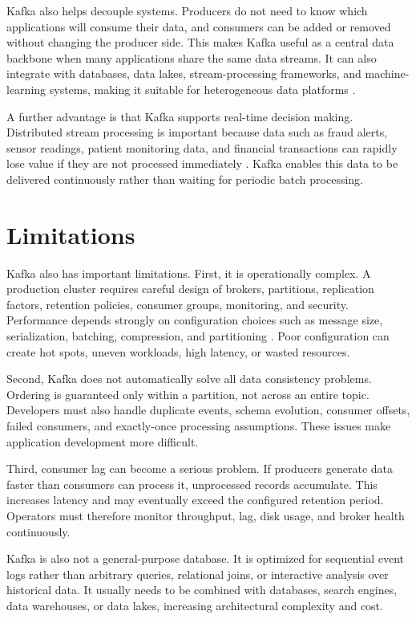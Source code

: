 \documentclass[10pt,a4paper,twocolumn]{article}
\begin{document}
Kafka also helps decouple systems. Producers do not need to know which applications will consume their data, and consumers can be added or removed without changing the producer side. This makes Kafka useful as a central data backbone when many applications share the same data streams. It can also integrate with databases, data lakes, stream-processing frameworks, and machine-learning systems, making it suitable for heterogeneous data platforms \cite{raptis2023survey}.

A further advantage is that Kafka supports real-time decision making. Distributed stream processing is important because data such as fraud alerts, sensor readings, patient monitoring data, and financial transactions can rapidly lose value if they are not processed immediately \cite{isah2019survey}. Kafka enables this data to be delivered continuously rather than waiting for periodic batch processing.

\section{Limitations}

Kafka also has important limitations. First, it is operationally complex. A production cluster requires careful design of brokers, partitions, replication factors, retention policies, consumer groups, monitoring, and security. Performance depends strongly on configuration choices such as message size, serialization, batching, compression, and partitioning \cite{raptis2023survey}. Poor configuration can create hot spots, uneven workloads, high latency, or wasted resources.

Second, Kafka does not automatically solve all data consistency problems. Ordering is guaranteed only within a partition, not across an entire topic. Developers must also handle duplicate events, schema evolution, consumer offsets, failed consumers, and exactly-once processing assumptions. These issues make application development more difficult.

Third, consumer lag can become a serious problem. If producers generate data faster than consumers can process it, unprocessed records accumulate. This increases latency and may eventually exceed the configured retention period. Operators must therefore monitor throughput, lag, disk usage, and broker health continuously.

Kafka is also not a general-purpose database. It is optimized for sequential event logs rather than arbitrary queries, relational joins, or interactive analysis over historical data. It usually needs to be combined with databases, search engines, data warehouses, or data lakes, increasing architectural complexity and cost.
\end{document}
